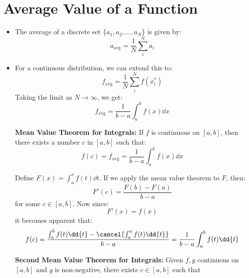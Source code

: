 \section{Average Value of a Function}
\begin{itemize}
    \item The average of a discrete set $\{a_1,a_2,\dots,a_N\}$ is given by:
    \begin{equation}
        a_\text{avg} = \frac{1}{N}\sum_{i}^{N} a_i
        \label{eq:}
    \end{equation}
    \item For a continuous distribution, we can extend this to:
    \begin{equation}
        f_\text{avg} = \frac{1}{N}\sum_{i}^N f(x_i^*)
        \label{eq:}
    \end{equation}
    Taking the limit as $N\to\infty$, we get:
    \begin{equation}
        f_\text{avg} = \frac{1}{b-a} \int_a^b f(x) \dd{x}
        \label{eq:}
    \end{equation}
    \begin{theorem}
        \textbf{Mean Value Theorem for Integrals:} If $f$ is continuous on $[a,b]$, then there exists a number $c$ in $[a,b]$ such that:
        \begin{equation}
            f(c) = f_\text{avg} = \frac{1}{b-a} \int_a^b f(x) \dd{x}
            \label{eq:}
        \end{equation}      
    \end{theorem}
    \begin{prooof}
        Define $F(x)=\int_a^x f(t) \dd{t}$. If we apply the mean value theorem to $F$, then:
        \begin{equation}
            F'(c) = \frac{F(b)-F(a)}{b-a}
            \label{eq:}
        \end{equation}
        for some $c \in [a,b]$. Now since:
        \begin{equation}
            F'(x) = f(x)
            \label{eq:}
        \end{equation}
        it becomes apparent that:
        \begin{equation}
            f(c) = \frac{\int_a^b f(t) \dd{t} - \cancel{\int_a^a f(t) \dd{t}}}{b-a} = \frac{1}{b-a}\int_a^b f(t) \dd{t}
            \label{eq:}
        \end{equation}
    \end{prooof}
    \begin{theorem}
        \textbf{Second Mean Value Theorem for Integrals:} Given $f,g$ continuous on $[a,b]$ and $g$ is non-negative, there exists $c\in [a,b]$ such that 

\end{theorem}
\end{itemize}
